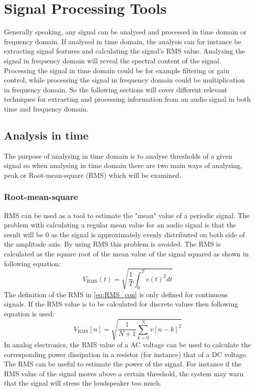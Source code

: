 \chapter{Signal Processing Tools}
Generally speaking, any signal can be analysed and processed in time domain or frequency domain. If analysed in time domain, the analysis can for instance be extracting signal features and calculating the signal's RMS value. Analysing the signal in frequency domain will reveal the spectral content of the signal. Processing the signal in time domain could be for example filtering or gain control, while processing the signal in frequency domain could be multiplication in frequency domain. So the following sections will cover different relevant techniques for extracting and processing information from an audio signal in both time and frequency domain.

\section{Analysis in time} \label{sec:SignalTime}
The purpose of analysing in time domain is to analyse thresholds of a given signal so when analysing in time domain there are two main ways of analysing, peak or Root-mean-square (RMS) which will be examined.
\subsection*{Root-mean-square}
RMS can be used as a tool to estimate the "mean" value of a periodic signal. The problem with calculating a regular mean value for an audio signal is that the result will be 0 as the signal is approximately evenly distributed on both side of the amplitude axis. By using RMS this problem is avoided. The RMS is calculated as the square root of the mean value of the signal squared as shown in following equation:
\begin{equation}\label{eq:RMS_con}
V_{\text{RMS}}(t) = \sqrt{\frac{1}{T}\int_0^T v(t)^2 dt}
\end{equation}
The definition of the RMS in \autoref{eq:RMS_con} is only defined for continuous signals. If the RMS value is to be calculated for discrete values then following equation is used:
\begin{equation}
V_{\text{RMS}}[n] = \sqrt{\frac{1}{N+1}\sum_{k=0}^{N} v[n-k]^2}
\end{equation}
In analog electronics, the RMS value of a AC voltage can be used to calculate the corresponding power dissipation in a resistor (for instance) that of a DC voltage. The RMS can be useful to estimate the power of the signal. For instance if the RMS value of the signal moves above a certain threshold, the system may warn that the signal will stress the loudspeaker too much.

